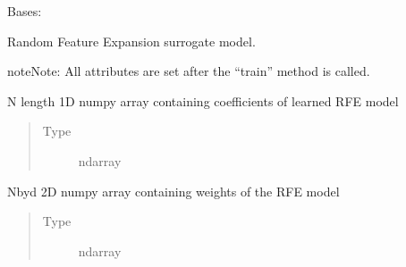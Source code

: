 \documentclass[letterpaper,10pt,english]{sphinxmanual}
\begin{document}
\begin{fulllineitems}
\label{\detokenize{rom:rom.response_surfaces.RFE}}
\sphinxAtStartPar
Bases: 

\sphinxAtStartPar
Random Feature Expansion surrogate model.

\begin{sphinxadmonition}{note}{Note:}
\sphinxAtStartPar
All attributes are set after the “train” method is called.
\end{sphinxadmonition}

\begin{fulllineitems}
\label{\detokenize{rom:rom.response_surfaces.RFE.c}}
\sphinxAtStartPar
N length 1D numpy array containing coefficients of learned RFE model
\begin{quote}\begin{description}
\item[{Type}] \leavevmode
\sphinxAtStartPar
ndarray

\end{description}\end{quote}

\end{fulllineitems}


\begin{fulllineitems}
\label{\detokenize{rom:rom.response_surfaces.RFE.Omega}}
\sphinxAtStartPar
N\sphinxhyphen{}by\sphinxhyphen{}d 2D numpy array containing weights of the RFE model
\begin{quote}\begin{description}
\item[{Type}] \leavevmode
\sphinxAtStartPar
ndarray

\end{description}\end{quote}

\end{fulllineitems}



\end{fulllineitems}
\end{document}
